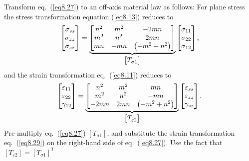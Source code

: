 \documentclass{AeroStructure-ERJohnson}
\begin{document}
Transform eq.~(\ref{eq8.27}) to an off-axis material law as
follows: For plane stress the stress transformation equation
(\ref{eq8.13}) reduces to
\begin{align}\label{eq8.28}
\left[\begin{array}{@{}c@{}} \sigma_{s s}\\
\sigma_{z z}\\
\sigma_{s z}
\end{array}\right]=\underbrace{\left[\begin{array}{@{}ccc@{}}
n^{2} & m^{2} & -2 m n\\
m^{2} & n^{2} & 2 m n\\
m n & -m n &
\left(-m^{2}+n^{2}\right)
\end{array}\right]}_{\left[\begin{array}{@{}c@{}} T_{\sigma 1}
\end{array}\right]}\left[\begin{array}{@{}l@{}} \sigma_{11}\\
\sigma_{22}\\
\sigma_{12} \end{array}\right] ,
\end{align}
and the strain transformation eq.~(\ref{eq8.11}) reduces to
\begin{align}\label{eq8.29}
\left[\begin{array}{@{}l@{}} \varepsilon_{11}\\
\varepsilon_{22}\\
\gamma_{12}
\end{array}\right]=\underbrace{\left[\begin{array}{@{}ccc@{}}
n^{2} & m^{2} & m n\\
m^{2} & n^{2} & -m n\\
-2 m n & 2mn & \left(-m^{2}+n^{2}\right)\end{array}\right]}_{\left[\begin{array}{@{}c@{}}T_{\varepsilon2}\end{array}\right]}\left[\begin{array}{@{}c@{}} \varepsilon_{ss}\\
\varepsilon_{z z}\\
\gamma_{s z} \end{array}\right].
\end{align}
Pre-multiply eq.~(\ref{eq8.27}) $ \left[T_{\sigma 1}\right]$, and
substitute the strain transformation eq.~(\ref{eq8.29}) on the
right-hand side of eq.~(\ref{eq8.27}). Use the fact that $
\left[T_{\varepsilon 2}\right]=\left[T_{\sigma 1}\right]^{T} $
\end{document}
